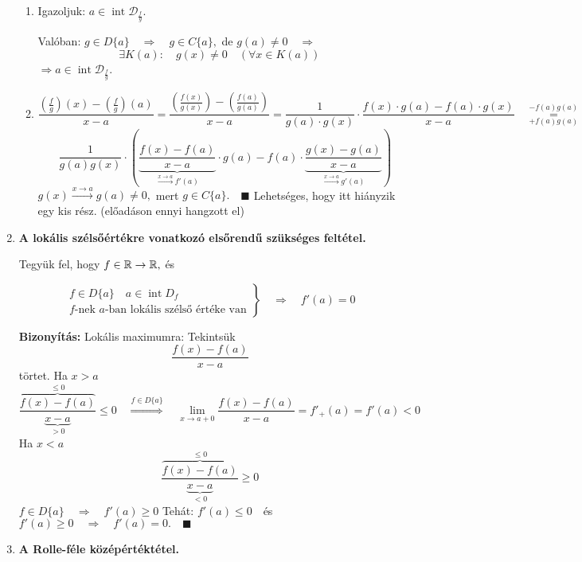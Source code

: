 \documentclass[a4paper,11.5pt]{article}
\DeclareMathOperator{\Int}{int}
\begin{document}
\begin{enumerate}
		\begin{enumerate}
			\item Igazoljuk: \quad $a\in\Int\mathcal{D}_{\frac{f}{g}}$.
			
			Valóban: $g\in D\{a\}\quad \Rightarrow\quad g\in C\{a\},$ de $g(a)\not=0\quad \Rightarrow$
			\[ \exists K(a):\quad g(x)\not=0\quad (\forall x\in K(a)) \]
			$\Rightarrow a\in \Int \mathcal{D}_{\frac{f}{g}}$.
			\item 
			
			\[\frac{\left(\frac{f}{g}\right)(x)-\left(\frac{f}{g}\right)(a)}{x-a}=\frac{\left(\frac{f(x)}{g(x)}\right)-\left(\frac{f(a)}{g(a)}\right)}{x-a}=\frac{1}{g(a)\cdot g(x)}\cdot\frac{f(x)\cdot g(a)-f(a)\cdot g(x)}{x-a}\quad \overset{-f(a)g(a)}{\underset{+f(a)g(a)}{=}}\]\[\quad \frac{1}{g(a)g(x)}\cdot\left(\underbrace{\frac{f(x)-f(a)}{x-a}}_{\overset{x\to a}{\longrightarrow} f'(a)}\cdot g(a)-f(a)\cdot\underbrace{\frac{g(x)-g(a)}{x-a}}_{\overset{x\to a}{\longrightarrow}g'(a)}\right) \]
			$g(x)\overset{x\to a}{\longrightarrow }g(a)\not=0,$ mert $g\in C\{a\}.\quad \blacksquare$
			{\Large Lehetséges, hogy itt hiányzik egy kis rész. (előadáson ennyi hangzott el)}
		\end{enumerate}
		\item \textbf{A lokális szélsőértékre vonatkozó elsőrendű szükséges feltétel.}
		
		Tegyük fel, hogy $f\in\mathbb{R}\to\mathbb{R},$ és 
		
		\[\left.\begin{gathered}
		f\in D\{a\}\quad a\in\Int D_f\\
		f\text{-nek } a\text{-ban lokális szélső értéke van}
		\end{gathered}\right\}\quad \Rightarrow\quad f'(a)=0\]
		
		\textbf{Bizonyítás:} Lokális maximumra:
		Tekintsük
		\[ \frac{f(x)-f(a)}{x-a} \]
		törtet. Ha $x>a$
		\[ \frac{\overbrace{f(x)-f(a)}^{\leq 0}}{\underbrace{x-a}_{>0}}\leq 0\quad \overset{f\in D\{a\}}{\Rightarrow}\quad \lim_{x\to a+0}\frac{f(x)-f(a)}{x-a}=f'_+(a)=f'(a)<0 \]
		Ha $x<a$
		\[ \frac{\overbrace{f(x)-f(a)}^{\leq 0}}{\underbrace{x-a}_{<0}}\geq 0 \]
		$f\in D\{a\}\quad \Rightarrow\quad f'(a)\geq0$
		Tehát: $f'(a)\leq0\quad $és\quad $f'(a)\geq0\quad  \Rightarrow\quad f'(a)=0.\quad \blacksquare$
		\item \textbf{A Rolle-féle középértéktétel.}
		

\end{enumerate}
\end{document}
